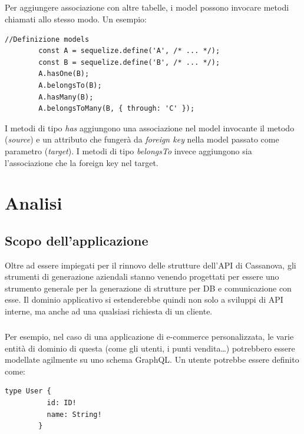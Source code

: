 \documentclass[a4paper, 12pt]{report}
\begin{document}
      \paragraph*{}
      Per aggiungere associazione con altre tabelle, i model possono invocare metodi chiamati allo stesso modo. Un esempio:
      \begin{Verbatim}[samepage=true]
        //Definizione models
        const A = sequelize.define('A', /* ... */);
        const B = sequelize.define('B', /* ... */);
        A.hasOne(B);
        A.belongsTo(B);
        A.hasMany(B);
        A.belongsToMany(B, { through: 'C' });
      \end{Verbatim}
       I metodi di tipo \emph{has} aggiungono una associazione nel model invocante il metodo (\emph{source}) e un attributo che fungerà da \emph{foreign key} nella model passato come parametro (\emph{target}).
       I metodi di tipo \emph{belongsTo} invece aggiungono sia l'associazione che la foreign key nel target.
  \newpage
  \chapter{Analisi}
    \section{Scopo dell'applicazione}
      Oltre ad essere impiegati per il rinnovo delle strutture dell'API di Cassanova, gli strumenti di generazione aziendali stanno venendo progettati per essere uno strumento generale per la generazione di strutture per DB e comunicazione con esse.
      Il dominio applicativo si estenderebbe quindi non solo a sviluppi di API interne, ma anche ad una qualsiasi richiesta di un cliente.
      \paragraph*{}
      Per esempio, nel caso di una applicazione di e-commerce personalizzata, le varie entità di dominio di questa (come gli utenti, i punti vendita\dots) potrebbero essere modellate agilmente su uno schema GraphQL.
      Un utente potrebbe essere definito come:
      \begin{Verbatim}[samepage=true]
        type User {
          id: ID!
          name: String!
        }
      \end{Verbatim}
\end{document}
